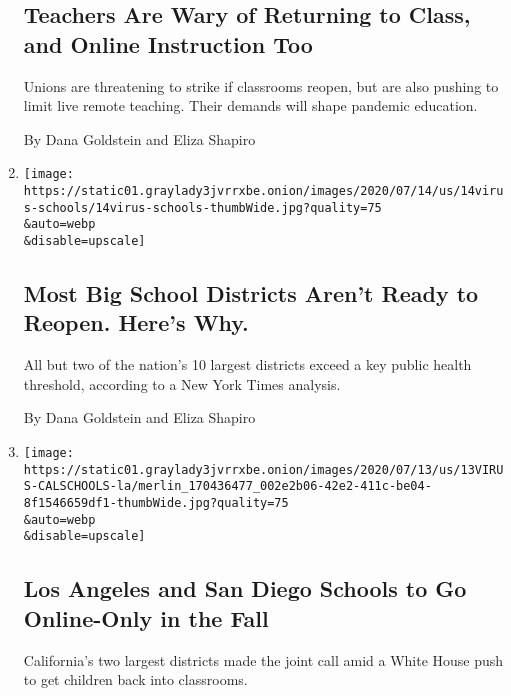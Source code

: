 \begin{enumerate}
  \hypertarget{teachers-are-wary-of-returning-to-class-and-online-instruction-too}{%
  \subsection{Teachers Are Wary of Returning to Class, and Online
  Instruction
  Too}\label{teachers-are-wary-of-returning-to-class-and-online-instruction-too}}

  Unions are threatening to strike if classrooms reopen, but are also
  pushing to limit live remote teaching. Their demands will shape
  pandemic education.

  By Dana Goldstein and Eliza Shapiro
\item
  \href{/2020/07/14/us/coronavirus-schools-fall.html}{}

  \texttt{[image: https://static01.graylady3jvrrxbe.onion/images/2020/07/14/us/14virus-schools/14virus-schools-thumbWide.jpg?quality=75\\\&auto=webp\\\&disable=upscale]}

  \hypertarget{most-big-school-districts-arent-ready-to-reopen-heres-why}{%
  \subsection{Most Big School Districts Aren't Ready to Reopen. Here's
  Why.}\label{most-big-school-districts-arent-ready-to-reopen-heres-why}}

  All but two of the nation's 10 largest districts exceed a key public
  health threshold, according to a New York Times analysis.

  By Dana Goldstein and Eliza Shapiro
\item
  \href{/2020/07/13/us/lausd-san-diego-school-reopening.html}{}

  \texttt{[image: https://static01.graylady3jvrrxbe.onion/images/2020/07/13/us/13VIRUS-CALSCHOOLS-la/merlin\_170436477\_002e2b06-42e2-411c-be04-8f1546659df1-thumbWide.jpg?quality=75\\\&auto=webp\\\&disable=upscale]}

  \hypertarget{los-angeles-and-san-diego-schools-to-go-online-only-in-the-fall}{%
  \subsection{Los Angeles and San Diego Schools to Go Online-Only in the
  Fall}\label{los-angeles-and-san-diego-schools-to-go-online-only-in-the-fall}}

  California's two largest districts made the joint call amid a White
  House push to get children back into classrooms.


\end{enumerate}
